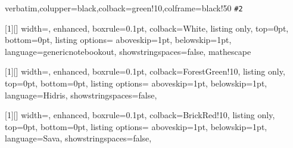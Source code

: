 {verbatim,colupper=black,colback=green!10,colframe=black!50}
{%
\lstinline[language=Sava,keywordstyle=\color{blue!35!white}\bfseries,columns=fullflexible]{#2}}

[1][\thenotebookcounter]{
  width=\linewidth, 
  enhanced,
  boxrule=0.1pt,
  colback=White,
  listing only,
  top=0pt,
  bottom=0pt,
  listing options={
    aboveskip=1pt,
    belowskip=1pt,
    language=genericnotebookout,
    showstringspaces=false,
    mathescape
  }
}

[1][\thenotebookcounter]{
  width=\linewidth, 
  enhanced,
  boxrule=0.1pt,
  colback=ForestGreen!10,
  listing only,
  top=0pt,
  bottom=0pt,
  listing options={
    aboveskip=1pt,
    belowskip=1pt,
    language=Hidris,
    showstringspaces=false,
  }
}

[1][\thenotebookcounter]{
  width=\linewidth, 
  enhanced,
  boxrule=0.1pt,
  colback=BrickRed!10,
  listing only,
  top=0pt,
  bottom=0pt,
  listing options={
    aboveskip=1pt,
    belowskip=1pt,
    language=Sava,
    showstringspaces=false,
  }
}
